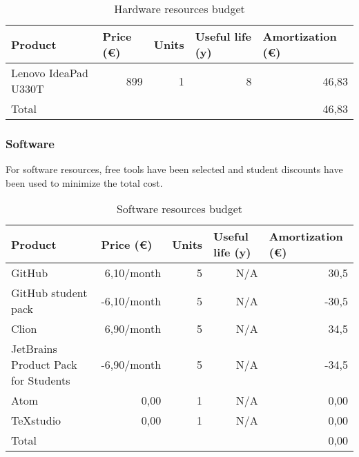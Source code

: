 \begin{table}[h!]
	\centering
	\begin{tabular}{|l|r|r|r|r|}
		\hline
		Product & \multicolumn{1}{l|}{Price (€)} & \multicolumn{1}{l|}{Units} & \multicolumn{1}{l|}{Useful life (y)} & \multicolumn{1}{l|}{Amortization (€)} \\ \hline
		Lenovo IdeaPad U330T & 899 & 1 & 8 & 46,83\\ \hline\hline
		Total & \multicolumn{4}{r|}{46,83} \\ \hline
	\end{tabular}
	\caption{Hardware resources budget}
	\label{HardwareResources}
\end{table}

\subsubsection{Software}
For software resources, free tools have been selected and student discounts have been used to minimize the total cost.
\begin{table}[h!]
	\centering
	\begin{tabular}{|l|r|r|r|r|}
		\hline
		Product              & \multicolumn{1}{l|}{Price (€)} & \multicolumn{1}{l|}{Units} & \multicolumn{1}{l|}{Useful life (y)} & \multicolumn{1}{l|}{Amortization (€)} \\ \hline
		GitHub	& 6,10/month & 5 & N/A & 30,5 \\ \hline
		GitHub student pack & -6,10/month & 5 & N/A & -30,5 \\ \hline
		Clion 	& 6,90/month & 5 & N/A & 34,5 \\ \hline
		JetBrains Product Pack for Students & -6,90/month & 5 & N/A & -34,5 \\ \hline
		Atom 	& 0,00 & 1 & N/A & 0,00 \\ \hline
		TeXstudio 	& 0,00 & 1 & N/A & 0,00 \\ \hline\hline
		Total	& \multicolumn{4}{r|}{0,00}                                                                                           \\ \hline
	\end{tabular}
	\caption{Software resources budget}
	\label{SoftwareResources}
\end{table}


